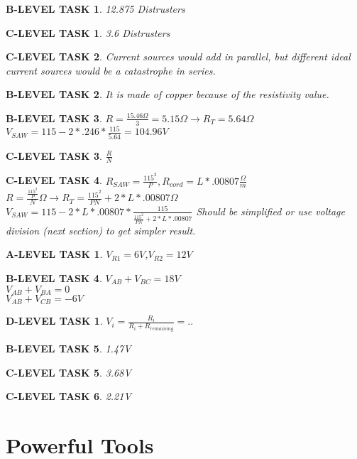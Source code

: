 \documentclass{book}
\numberwithin{equation}{section}
\newtheorem{alevel}{A-LEVEL TASK}
\newtheorem{blevel}{B-LEVEL TASK}
\newtheorem{clevel}{C-LEVEL TASK}
\newtheorem{dlevel}{D-LEVEL TASK}
\theoremstyle{definition}
\begin{document}
\begin{blevel}12.875 Distrusters\end{blevel}
\begin{clevel}3.6 Distrusters\end{clevel}
\begin{clevel}Current sources would add in parallel, but different ideal current sources would be a catastrophe in series.\end{clevel}
\begin{blevel}It is made of copper because of the resistivity value.\end{blevel}
\begin{blevel}$R=\frac{15.46\Omega}{3}=5.15 \Omega \rightarrow R_T=5.64\Omega$\\
$V_{SAW}=115-2*.246*\frac{115}{5.64}=104.96V$\end{blevel}
\begin{clevel}$\frac{R}{N}$\end{clevel}
\begin{clevel}$R_{SAW}=\frac{115^2}{P}, R_{cord}=L*.00807 \frac{\Omega}{m}$\\
$R=\frac{\frac{115^2}{P}}{N}\Omega \rightarrow R_T=\frac{115^2}{PN}+2*L*.00807 \Omega $\\
$V_{SAW}=115-2*L*.00807*\frac{115}{\frac{115^2}{PN}+2*L*.00807}$
Should be simplified or use voltage division (next section) to get simpler result.
\end{clevel}

\begin{alevel}$V_{R1}=6V$,$V_{R2}=12V$\end{alevel}
\begin{blevel}$V_{AB}+V_{BC}=18V$\\
$V_{AB}+V_{BA}=0$\\
$V_{AB}+V_{CB}=-6V$
\end{blevel}
\begin{dlevel}$V_i=\frac{R_i}{R_i+R_{remaining}}=..$\end{dlevel}
\begin{blevel}1.47V\end{blevel}
\begin{clevel}3.68V\end{clevel}
\begin{clevel}2.21V\end{clevel}

\chapter{Powerful Tools}
\end{document}
